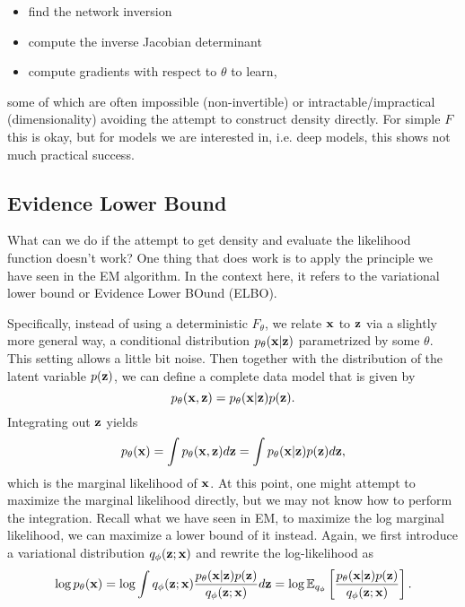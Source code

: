 \documentclass[../book-template.tex]{subfiles}
\begin{document}
\begin{itemize}
	\item find the network inversion
	\item compute the inverse Jacobian determinant
	\item compute gradients with respect to $\theta$ to learn,
\end{itemize}
some of which are often impossible (non-invertible) or intractable/impractical (dimensionality) avoiding the attempt to construct density directly. For simple $F$ this is okay, but for models we are interested in, i.e. deep models, this shows not much practical success.
\subsection{Evidence Lower Bound}
What can we do if the attempt to get density and evaluate the likelihood function doesn't work? One thing that does work is to apply the principle we have seen in the EM algorithm. In the context here, it refers to the variational lower bound or Evidence Lower BOund (ELBO). 
\par Specifically, instead of using a deterministic $F_{\theta}$, we relate ${\bf x}$ to ${\bf z}$ via a slightly more general way, a conditional distribution $p_{\theta}({\bf x}|{\bf z})$ parametrized by some $\theta$. This setting allows a little bit noise. Then together with the distribution of the latent variable $p({\bf z})$, we can define a complete data model that is given by
\begin{equation*}
	p_{\theta}({\bf x},{\bf z})=p_{\theta}({\bf x}|{\bf z})p({\bf z}).
\end{equation*}
Integrating out ${\bf z}$ yields
\begin{equation*}
	p_{\theta}({\bf x})=\int p_{\theta}({\bf x},{\bf z})d{\bf z} = \int p_{\theta}({\bf x}|{\bf z})p({\bf z})d{\bf z},
\end{equation*}
which is the marginal likelihood of ${\bf x}$. At this point, one might attempt to maximize the marginal likelihood directly, but we may not know how to perform the integration. Recall what we have seen in EM, to maximize the log marginal likelihood, we can maximize a lower bound of it instead. Again, we first introduce a variational distribution $q_{\phi}({\bf z};{\bf x})$ and rewrite the log-likelihood as
\begin{equation*}
	\log p_{\theta}({\bf x})=\log \int q_{\phi}({\bf z};{\bf x}) \frac{p_{\theta}({\bf x}|{\bf z})p({\bf z})}{q_{\phi}({\bf z};{\bf x})}d{\bf z} = \log \mathbb{E}_{q_{\phi}} \left[\frac{p_{\theta}({\bf x}|{\bf z})p({\bf z})}{q_{\phi}({\bf z};{\bf x})}\right].
\end{equation*}
\end{document}
